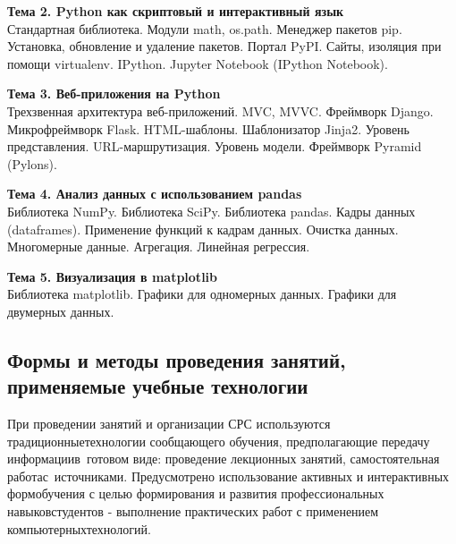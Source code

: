 \documentclass[a4paper,12pt]{article}
\begin{document}
\textbf{Тема 2. Python как скриптовый и интерактивный язык }\\
Стандартная библиотека. Модули math, os.path. Менеджер пакетов pip.
Установка, обновление и удаление пакетов. Портал PyPI. Сайты,
изоляция при помощи virtualenv. IPython. Jupyter Notebook (IPython
Notebook).


\textbf{Тема 3. Веб-приложения на Python                   }\\
Трехзвенная архитектура веб-приложений. MVC, MVVC. Фреймворк Django.
Микрофреймворк Flask. HTML-шаблоны. Шаблонизатор Jinja2.
Уровень представления. URL-маршрутизация. Уровень модели. Фреймворк
Pyramid (Pylons).


\textbf{Тема 4. Анализ данных с использованием pandas      }\\
Библиотека NumPy. Библиотека SciPy. Библиотека pandas. Кадры данных
(dataframes). Применение функций к кадрам данных. Очистка данных.
Многомерные данные. Агрегация. Линейная регрессия.


\textbf{Тема 5. Визуализация в matplotlib                  }\\
Библиотека matplotlib. Графики для одномерных данных. Графики для
двумерных данных.

 

\subsection{Формы и методы проведения занятий, применяемые учебные технологии}
При проведении занятий и организации СРС используются традиционныетехнологии сообщающего обучения, предполагающие передачу информациив~готовом виде: проведение лекционных занятий, самостоятельная работас~источниками. Предусмотрено использование активных и интерактивных формобучения с целью формирования и развития профессиональных навыковстудентов - выполнение практических работ с применением компьютерныхтехнологий.
\end{document}
